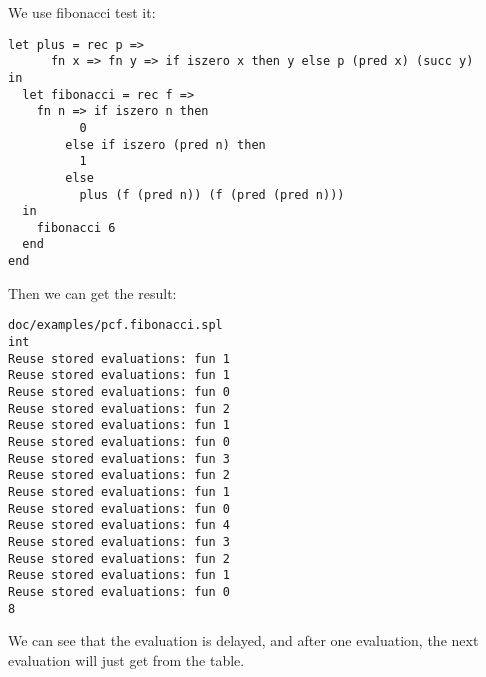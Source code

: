 \documentclass[paper=a4, fontsize=11pt]{scrartcl}
\begin{document}
We use fibonacci test it:
\begin{lstlisting}[title=pcf.fibonacci.spl, frame=shadowbox]
let plus = rec p =>
      fn x => fn y => if iszero x then y else p (pred x) (succ y)
in
  let fibonacci = rec f =>
	fn n => if iszero n then
		  0
		else if iszero (pred n) then
		  1
		else
		  plus (f (pred n)) (f (pred (pred n)))
  in
    fibonacci 6
  end
end
\end{lstlisting}
Then we can get the result: 
\begin{lstlisting}[title=Result, frame=shadowbox]
doc/examples/pcf.fibonacci.spl
int
Reuse stored evaluations: fun 1
Reuse stored evaluations: fun 1
Reuse stored evaluations: fun 0
Reuse stored evaluations: fun 2
Reuse stored evaluations: fun 1
Reuse stored evaluations: fun 0
Reuse stored evaluations: fun 3
Reuse stored evaluations: fun 2
Reuse stored evaluations: fun 1
Reuse stored evaluations: fun 0
Reuse stored evaluations: fun 4
Reuse stored evaluations: fun 3
Reuse stored evaluations: fun 2
Reuse stored evaluations: fun 1
Reuse stored evaluations: fun 0
8
\end{lstlisting}
We can see that the evaluation is delayed, and after one evaluation, the next evaluation will just get from the table.


\end{document}
